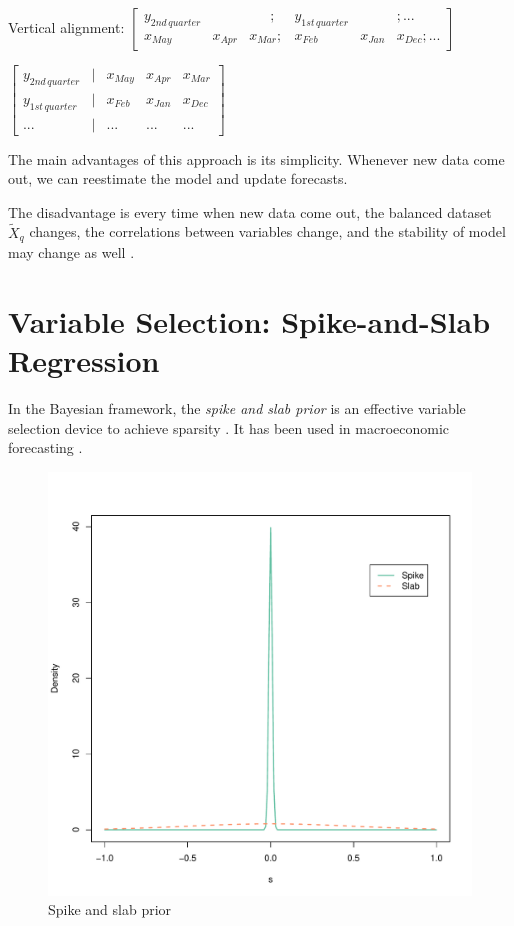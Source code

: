 \begin{center}
Vertical alignment:		$\begin{bmatrix}
	y_{2nd \, quarter}  &  & \,\,\,\quad ;& y_{1st \, quarter} & &; ...\\
	x_{May} & x_{Apr} & x_{Mar}; &  x_{Feb} & x_{Jan} & x_{Dec} ;...
	\end{bmatrix}$
	
	$\begin{bmatrix}	
	
	y_{2nd \, quarter} & |  & x_{May} & x_{Apr} & x_{Mar} \\
	y_{1st \, quarter} & |  & x_{Feb} & x_{Jan} & x_{Dec} \\
	... & |  & ... & ... & ...	
	\end{bmatrix}$\\
\end{center} 

The main advantages of this approach is its simplicity. Whenever new data come out, we can reestimate the model and update forecasts. 

The disadvantage is every time when new data come out, the balanced dataset $\tilde X_q$ changes, the correlations between variables change, and the stability of model may change as well \cite{Foroni2013} .



\section{Variable Selection: Spike-and-Slab Regression}

In the Bayesian framework, the \textit{spike and slab prior} is an effective variable selection device to achieve sparsity \cite{George1997, Madigan1994a}  . It has been used in macroeconomic forecasting \cite{Rodriguez2010,Kaufmann2012,Ferrara2014} .


\begin{figure}[h]
\centering
\includegraphics[width=0.5\linewidth]{Figures/spike}
\caption{Spike and slab prior}
\label{fig:spike}
\end{figure}


